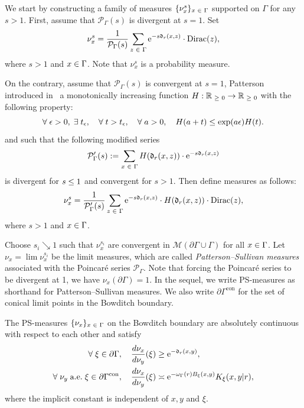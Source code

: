 \documentclass[10pt]{amsart}
\theoremstyle{definition}\newtheorem{defi}[theo]{Definition}\newtheorem{rema}[theo]{Remark}\newtheorem{exam}[theo]{Example}\newtheorem{exem}[theo]{Example}\newtheorem{nota}[theo]{Notation}
\newcommand{\pG}{\partial{\Gamma}}
\newcommand{\dirac}[1]{{\mathrm{Dirac}}{(#1)}}
\newcommand{\R}{\mathbb{R}}
\newcommand{\rme}{\mathrm{e}}
\newcommand{\fkd}{\mathfrak{d}}
\newcommand{\clM}{\mathcal{M}}
\newcommand{\clP}{\mathcal{P}}
\DeclareMathOperator{\con}{con}
\let\oldin\in
\renewcommand{\in}{\mathchoice{\oldin}{\oldin}{\,\oldin\,}{\,\oldin\,}}
\let\oldge\ge
\renewcommand{\ge}{\mathchoice{\oldge}{\oldge}{\,\oldge\,}{\,\oldge\,}}
\let\oldle\le
\renewcommand{\le}{\mathchoice{\oldle}{\oldle}{\,\oldle\,}{\,\oldle\,}}
\renewcommand*{\to}{\mathchoice{\longrightarrow}{\rightarrow}{\rightarrow}{\rightarrow}}
\let\oldexists\exists
\renewcommand*{\exists}{\mathrel{\oldexists}}
\let\oldforall\forall
\renewcommand*{\forall}{\mathrel{\oldforall}}
\begin{document}
We start by constructing a family of measures $\{\nu_x^s\}_{x\in \Gamma}$ supported on $\Gamma$ for any $s >1$. First, assume that $\clP_\Gamma(s)$ is divergent at $s=1$. Set
\[
\nu^s_x = \frac{1}{\clP_{\Gamma}(s)} \sum\limits_{z \in \Gamma} \rme^{-s\fkd_r(x,z)} \cdot \dirac{z},
\]
where $s >1$ and $x \in \Gamma$. Note that $\nu^s_x$ is a probability measure.


On the contrary, assume that $\clP_{\Gamma}(s)$ is convergent at $s=1$, Patterson introduced in~\cite[Lemma~3.1]{Patt} a monotonically increasing function $H: \R_{\ge 0} \to \R_{\ge 0}$ with the following property:
\begin{equation}\label{patterson}
\forall \epsilon >0, \;\exists t_\epsilon,\quad \forall t > t_\epsilon,\quad \forall a>0,\quad  H(a+t) \le \exp(a\epsilon) H(t).
\end{equation}
and such that the following modified series
\[
\clP_{\Gamma}'(s):=\sum\limits_{x \in \Gamma} H(\fkd_r(x,z)) \cdot \rme^{-s\fkd_r(x,z)}
\]
is divergent for $s \le 1$ and convergent for $s>1$.
Then define measures as follows:
\[
\nu^s_x = \frac{1}{\clP_{\Gamma}'(s)} \sum\limits_{z \in \Gamma} \rme^{-s \fkd_r(x,z)} \cdot H(\fkd_r(x,z)) \cdot \dirac{z},
\]
where $s >1$ and $x \in \Gamma$.

Choose $s_i \searrow 1$ such that $\nu_x^{s_i}$ are convergent in $\clM(\pG\cup\Gamma)$ for all $x\in \Gamma$. Let $\nu_x = \lim \nu_x^{s_i}$ be the limit measures, which are called \emph{Patterson--Sullivan measures} associated with the Poincaré series $\clP_\Gamma$. Note that forcing the Poincaré series to be divergent at 1, we have $\nu_x(\pG) = 1$. In the sequel, we write PS-measures as shorthand for Patterson--Sullivan measures. We also write $\partial\Gamma^{\con}$ for the set of conical limit points in the Bowditch boundary.



\begin{prop}\label{prequasiconf}
The PS-measures $\{\nu_x\}_{x\in \Gamma}$ on the Bowditch boundary are absolutely continuous with respect to each other and satisfy
\begin{align}
\forall \xi\in \pG ,\quad  \frac{d\nu_x}{d\nu_y}(\xi) &\ge \rme^{-\fkd_r(x,y)},\label{LowerBoundEQ}\\
\forall \nu_y\; \text{a.e.}\; \xi\in \pG^{\con},\quad  \frac{d\nu_{x}}{d\nu_{y}}(\xi) &\asymp \rme^{-\omega_\Gamma(r) B_\xi (x, y)}K_{\xi}(x,y|r),\label{cdensity}
\end{align}
where the implicit constant is independent of $x,y$ and $\xi$.
\end{prop}
\end{document}
